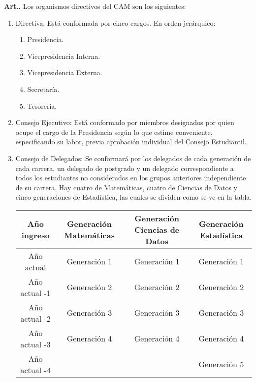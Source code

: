 \documentclass[letterpaper,11pt]{article}
\newcounter{art}
\newenvironment{art}{\refstepcounter{art}\mbox{\textbf{Art.{\space}\theart.}}\ignorespaces}{}
\begin{document}
\begin{art}\label{organismosDirectivos}
    Los organismos directivos del CAM son los siguientes:
    \begin{enumerate}
        \item Directiva: Está conformada por cinco cargos. En orden jerárquico:
              \begin{enumerate}
                  \item Presidencia.
                  \item Vicepresidencia Interna.
                  \item Vicepresidencia Externa.
                  \item Secretaría.
                  \item Tesorería.
              \end{enumerate}
        \item Consejo Ejecutivo: Está conformado por miembros designados por quien ocupe el cargo de la Presidencia según lo que estime conveniente, especificando su labor, previa aprobación individual del Consejo Estudiantil.
        \item Consejo de Delegados: Se conformará por los delegados de cada generación de cada carrera, un delegado de postgrado y un delegado correspondiente a todos los estudiantes no considerados en los grupos anteriores independiente de su carrera. Hay cuatro de Matemáticas, cuatro de Ciencias de Datos y cinco generaciones de Estadística, las cuales se dividen como se ve en la tabla.
              \begin{figure*}[h]
                  \begin{tabular}{|c|c|c|c|}
                      \hline
                      Año ingreso   & Generación Matemáticas & Generación Ciencias de Datos & Generación Estadística \\
                      \hline
                      Año actual    & Generación 1           & Generación 1                 & Generación 1           \\
                      Año actual -1 & Generación 2           & Generación 2                 & Generación 2           \\
                      Año actual -2 & Generación 3           & Generación 3                 & Generación 3           \\
                      Año actual -3 & Generación 4           & Generación 4                 & Generación 4           \\
                      Año actual -4 &                        &                              & Generación 5           \\

\end{tabular}
\end{figure*}
\end{enumerate}
\end{art}
\end{document}
